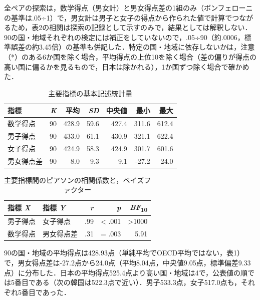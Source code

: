\documentclass[a4paper,10pt,twocolumn]{ltjsarticle}
\makeatletter
\renewcommand{\section}{\@startsection{section}{1}{\z@}{1.1\Cvs \@plus.4\Cdp \@minus.2\Cdp}{.5\Cvs \@plus.2\Cdp}{\normalfont\gtfamily\bfseries\large}}
\makeatother
\begin{document}
全ペアの探索は，数学得点（男女計）と男女得点差の1組のみ（ボンフェローニの基準は.05÷1）で，男女計は男子と女子の得点から作られた値で計算でつながるため，表2の相関は探索の記録として示すのみで，結果としては解釈しない．90の国・地域それぞれの検定には補正をしていないので，.05÷90（約.0006，標準誤差の約3.45倍）の基準も併記した．特定の国・地域に依存しないかは，注意（*）のある6か国を除く場合，平均得点の上位10を除く場合（差の偏りが得点の高い国に偏るかを見るもので，日本は除かれる），1か国ずつ除く場合で確かめた．
\begin{table}[!t]
\caption{主要指標の基本記述統計量}
\centering\small
\begin{tabular}{>{\raggedright\arraybackslash}p{9.2cm}rrrrrr}
\toprule
指標 & \textit{K} & 平均 & \textit{SD} & 中央値 & 最小 & 最大 \\
\midrule
数学得点 & 90 & 428.9 & 59.6 & 427.4 & 311.6 & 612.4 \\
男子得点 & 90 & 433.0 & 61.1 & 430.9 & 321.1 & 622.4 \\
女子得点 & 90 & 424.9 & 58.3 & 424.9 & 301.7 & 601.6 \\
男女得点差 & 90 & 8.0 & 9.3 & 9.1 & -27.2 & 24.0 \\
\bottomrule
\end{tabular}
\par{}
\end{table}
\begin{table}[!t]
\caption{主要指標間のピアソンの相関係数と，ベイズファクター}
\centering\small
\begin{tabular}{>{\raggedright\arraybackslash}p{6.4cm}>{\raggedright\arraybackslash}p{6.4cm}rrr}
\toprule
指標 \textit{X} & 指標 \textit{Y} & \textit{r} & \textit{p} & \textit{BF}\textsubscript{10} \\
\midrule
男子得点 & 女子得点 & .99 & < .001 & >1000 \\
数学得点 & 男女得点差 & .31 & = .003 & 5.91 \\
\bottomrule
\end{tabular}
\par{}
\end{table}
\section{結果}
90の国・地域の平均得点は428.93点（単純平均でOECD平均ではない，表1）で，男女得点差は-27.2点から24.0点（平均8.04点，中央値9.05点，標準偏差9.33点）に分布した．日本の平均得点525.4点より高い国・地域は4で，公表値の順では5番目である（次の韓国は522.3点で近い）．男子533.3点，女子517.0点も，それぞれ5番目であった．
\end{document}
